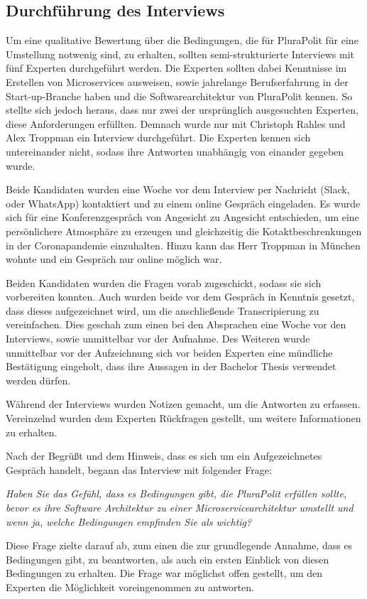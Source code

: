 \subsection{Durchführung des Interviews}

Um eine qualitative Bewertung über die Bedingungen, die für PluraPolit für eine Umstellung notwenig sind, zu erhalten, sollten semi-strukturierte Interviews mit fünf Experten durchgeführt werden. Die Experten sollten dabei Kenntnisse im Erstellen von Microservices ausweisen, sowie jahrelange Berufserfahrung in der Start-up-Branche haben und die Softwarearchitektur von PluraPolit kennen. So stellte sich jedoch heraus, dass nur zwei der ursprünglich ausgesuchten Experten, diese Anforderungen erfüllten. Demnach wurde nur mit Christoph Rahles und Alex Troppman ein Interview durchgeführt. Die Experten kennen sich untereinander nicht, sodass ihre Antworten unabhängig von einander gegeben wurde.

Beide Kandidaten wurden eine Woche vor dem Interview per Nachricht (Slack, oder WhatsApp) kontaktiert und zu einem online Gespräch eingeladen. Es wurde sich für eine Konferenzgespräch von Angesicht zu Angesicht entschieden, um eine persönlichere Atmosphäre zu erzeugen und gleichzeitig die Kotaktbeschrenkungen in der Coronapandemie einzuhalten. Hinzu kann das Herr Troppman in München wohnte und ein Gespräch nur online möglich war.

Beiden Kandidaten wurden die Fragen vorab zugeschickt, sodass sie sich vorbereiten konnten. Auch wurden beide vor dem Gespräch in Kenntnis gesetzt, dass dieses aufgezeichnet wird, um die anschließende Transcripierung zu vereinfachen. Dies geschah zum einen bei den Absprachen eine Woche vor den Interviews, sowie unmittelbar vor der Aufnahme. Des Weiteren wurde unmittelbar vor der Aufzeichnung sich vor beiden Experten eine mündliche Bestätigung eingeholt, dass ihre Aussagen in der Bachelor Thesis verwendet werden dürfen.

Während der Interviews wurden Notizen gemacht, um die Antworten zu erfassen. Vereinzelnd wurden dem Experten Rückfragen gestellt, um weitere Informationen zu erhalten.

Nach der Begrüßt und dem Hinweis, dass es sich um ein Aufgezeichnetes Gespräch handelt, begann das Interview mit folgender Frage: 

\textit{Haben Sie das Gefühl, dass es Bedingungen gibt, die PluraPolit erfüllen sollte, bevor es ihre Software Architektur zu einer Microservicearchitektur umstellt und wenn ja, welche Bedingungen empfinden Sie als wichtig?}

Diese Frage zielte darauf ab, zum einen die zur grundlegende Annahme, dass es Bedingungen gibt, zu beantworten, als auch ein ersten Einblick von diesen Bedingungen zu erhalten. Die Frage war möglichst offen gestellt, um den Experten die Möglichkeit voreingenommen zu antworten.

